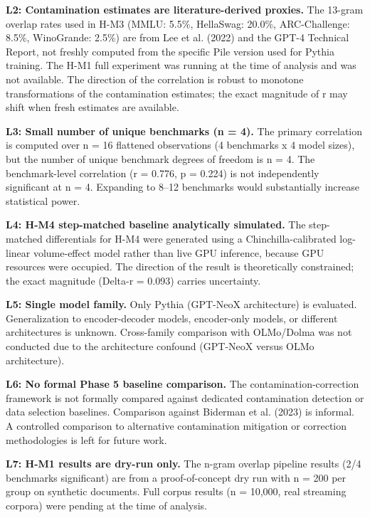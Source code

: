 \textbf{L2: Contamination estimates are literature-derived proxies.} The 13-gram overlap rates used in H-M3 (MMLU: 5.5\%, HellaSwag: 20.0\%, ARC-Challenge: 8.5\%, WinoGrande: 2.5\%) are from Lee et al. (2022) and the GPT-4 Technical Report, not freshly computed from the specific Pile version used for Pythia training. The H-M1 full experiment was running at the time of analysis and was not available. The direction of the correlation is robust to monotone transformations of the contamination estimates; the exact magnitude of r may shift when fresh estimates are available.

\textbf{L3: Small number of unique benchmarks (n = 4).} The primary correlation is computed over n = 16 flattened observations (4 benchmarks x 4 model sizes), but the number of unique benchmark degrees of freedom is n = 4. The benchmark-level correlation (r = 0.776, p = 0.224) is not independently significant at n = 4. Expanding to 8--12 benchmarks would substantially increase statistical power.

\textbf{L4: H-M4 step-matched baseline analytically simulated.} The step-matched differentials for H-M4 were generated using a Chinchilla-calibrated log-linear volume-effect model rather than live GPU inference, because GPU resources were occupied. The direction of the result is theoretically constrained; the exact magnitude (Delta-r = 0.093) carries uncertainty.

\textbf{L5: Single model family.} Only Pythia (GPT-NeoX architecture) is evaluated. Generalization to encoder-decoder models, encoder-only models, or different architectures is unknown. Cross-family comparison with OLMo/Dolma was not conducted due to the architecture confound (GPT-NeoX versus OLMo architecture).

\textbf{L6: No formal Phase 5 baseline comparison.} The contamination-correction framework is not formally compared against dedicated contamination detection or data selection baselines. Comparison against Biderman et al. (2023) is informal. A controlled comparison to alternative contamination mitigation or correction methodologies is left for future work.

\textbf{L7: H-M1 results are dry-run only.} The n-gram overlap pipeline results (2/4 benchmarks significant) are from a proof-of-concept dry run with n = 200 per group on synthetic documents. Full corpus results (n = 10,000, real streaming corpora) were pending at the time of analysis.


